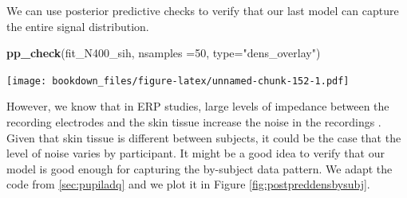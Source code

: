 \documentclass[12pt,]{krantz}
\newenvironment{Shaded}{\begin{snugshade}}{\end{snugshade}}
\newcommand{\DataTypeTok}[1]{\textcolor[rgb]{0.13,0.29,0.53}{#1}}
\newcommand{\DecValTok}[1]{\textcolor[rgb]{0.00,0.00,0.81}{#1}}
\newcommand{\KeywordTok}[1]{\textcolor[rgb]{0.13,0.29,0.53}{\textbf{#1}}}
\newcommand{\NormalTok}[1]{#1}
\newcommand{\StringTok}[1]{\textcolor[rgb]{0.31,0.60,0.02}{#1}}
\theoremstyle{definition}
\theoremstyle{definition}
\theoremstyle{definition}
\theoremstyle{remark}
\begin{document}
We can use posterior predictive checks to verify that our last model can capture the entire signal distribution.

\begin{Shaded}
\begin{Highlighting}[]
\KeywordTok{pp_check}\NormalTok{(fit_N400_sih, }\DataTypeTok{nsamples =}\DecValTok{50}\NormalTok{, }\DataTypeTok{type=}\StringTok{"dens_overlay"}\NormalTok{)}
\end{Highlighting}
\end{Shaded}

\texttt{[image: bookdown\_files/figure-latex/unnamed-chunk-152-1.pdf]}

However, we know that in ERP studies, large levels of impedance between the recording electrodes and the skin tissue increase the noise in the recordings \citep{picton_etal_2000}. Given that skin tissue is different between subjects, it could be the case that the level of noise varies by participant.
It might be a good idea to verify that our model is good enough for capturing the by-subject data pattern. We adapt the code from \ref{sec:pupiladq} and we plot it in Figure \ref{fig:postpreddensbysubj}.
\end{document}
